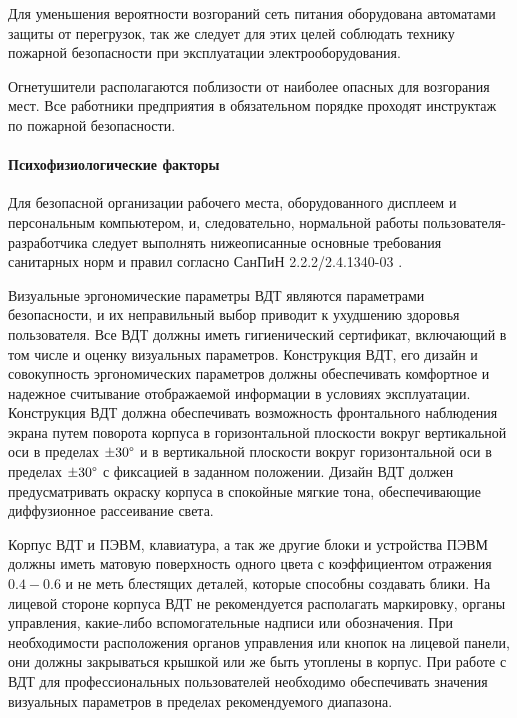 Для уменьшения вероятности возгораний сеть питания оборудована автоматами защиты от перегрузок,
так же следует для этих целей соблюдать технику пожарной безопасности при эксплуатации
электрооборудования.

Огнетушители располагаются поблизости от наиболее опасных для возгорания мест.
Все работники предприятия в обязательном порядке проходят инструктаж по пожарной
безопасности.

\paragraph{Психофизиологические факторы}

Для безопасной организации рабочего места, оборудованного дисплеем и персональным
компьютером, и, следовательно, нормальной работы пользователя-разработчика следует
выполнять нижеописанные основные требования санитарных норм и правил согласно
СанПиН 2.2.2/2.4.1340-03 \cite{ecology_sanpin_1340_03}.

Визуальные эргономические параметры ВДТ являются параметрами безопасности,
и их неправильный выбор приводит к ухудшению здоровья пользователя. Все ВДТ
должны иметь гигиенический сертификат, включающий в том числе и оценку визуальных
параметров. Конструкция ВДТ, его дизайн и совокупность эргономических параметров
должны обеспечивать комфортное и надежное считывание отображаемой информации в
условиях эксплуатации. Конструкция ВДТ должна обеспечивать возможность фронтального
наблюдения экрана путем поворота корпуса в горизонтальной плоскости вокруг
вертикальной оси в пределах $\pm 30 \degree$ и в вертикальной плоскости вокруг
горизонтальной оси в пределах $\pm 30 \degree$ с фиксацией в заданном положении.
Дизайн ВДТ должен предусматривать окраску корпуса в спокойные мягкие тона,
обеспечивающие диффузионное рассеивание света.

Корпус ВДТ и ПЭВМ, клавиатура, а так же другие блоки и устройства ПЭВМ должны
иметь матовую поверхность одного цвета с коэффициентом отражения $0.4 - 0.6$ и
не меть блестящих деталей, которые способны создавать блики. На лицевой стороне
корпуса ВДТ не рекомендуется располагать маркировку, органы управления, какие-либо
вспомогательные надписи или обозначения. При необходимости расположения органов
управления или кнопок на лицевой панели, они должны закрываться крышкой или же
быть утоплены в корпус. При работе с ВДТ для профессиональных пользователей необходимо
обеспечивать значения визуальных параметров в пределах рекомендуемого диапазона.

